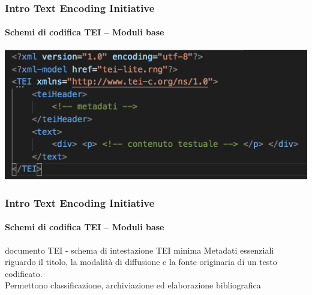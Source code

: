 \begin{frame}
	\frametitle{Intro Text Encoding Initiative}
	\framesubtitle{Schemi di codifica TEI – Moduli base}
	\addtocounter{nframe}{1}

	\begin{center}
		\includegraphics[width=.95\textwidth]{imgs/esempio2.png}
    \end{center}
    
   

\end{frame}

\begin{frame}
	\frametitle{Intro Text Encoding Initiative}
	\framesubtitle{Schemi di codifica TEI – Moduli base}
	\addtocounter{nframe}{1}

	\begin{block}{documento TEI - schema di intestazione TEI minima}
        Metadati essenziali riguardo il titolo, la modalità di diffusione e
        la fonte originaria di un testo codificato.
        \\Permettono classificazione, archiviazione ed elaborazione
        bibliografica
    \end{block}
    
\end{frame}


